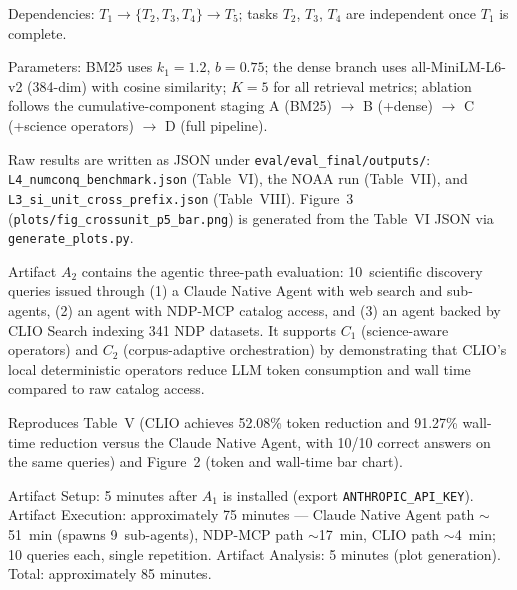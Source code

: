 \documentclass[conference]{IEEEtran}
\begin{document}
Dependencies: $T_1 \rightarrow \{T_2, T_3, T_4\} \rightarrow T_5$; tasks $T_2$, $T_3$, $T_4$ are independent once $T_1$ is complete.

Parameters: BM25 uses $k_1{=}1.2$, $b{=}0.75$; the dense branch uses all-MiniLM-L6-v2 (384-dim) with cosine similarity; $K{=}5$ for all retrieval metrics; ablation follows the cumulative-component staging A (BM25) $\rightarrow$ B (+dense) $\rightarrow$ C (+science operators) $\rightarrow$ D (full pipeline).

\artout

Raw results are written as JSON under \texttt{eval/eval\_final/outputs/}: \texttt{L4\_numconq\_benchmark.json} (Table~VI), the NOAA run (Table~VII), and \texttt{L3\_si\_unit\_cross\_prefix.json} (Table~VIII). Figure~3 (\texttt{plots/fig\_crossunit\_p5\_bar.png}) is generated from the Table~VI JSON via \texttt{generate\_plots.py}.



\newartifact

\artrel

Artifact $A_2$ contains the agentic three-path evaluation: 10~scientific discovery queries issued through (1) a Claude Native Agent with web search and sub-agents, (2) an agent with NDP-MCP catalog access, and (3) an agent backed by CLIO Search indexing 341 NDP datasets. It supports $C_1$ (science-aware operators) and $C_2$ (corpus-adaptive orchestration) by demonstrating that CLIO's local deterministic operators reduce LLM token consumption and wall time compared to raw catalog access.

\artexp

Reproduces Table~V (CLIO achieves 52.08\% token reduction and 91.27\% wall-time reduction versus the Claude Native Agent, with 10/10 correct answers on the same queries) and Figure~2 (token and wall-time bar chart).

\arttime

Artifact Setup: 5 minutes after $A_1$ is installed (export \texttt{ANTHROPIC\_API\_KEY}).
Artifact Execution: approximately 75 minutes --- Claude Native Agent path $\sim$51~min (spawns 9~sub-agents), NDP-MCP path $\sim$17~min, CLIO path $\sim$4~min; 10 queries each, single repetition.
Artifact Analysis: 5 minutes (plot generation).
Total: approximately 85 minutes.

\artin
\end{document}
